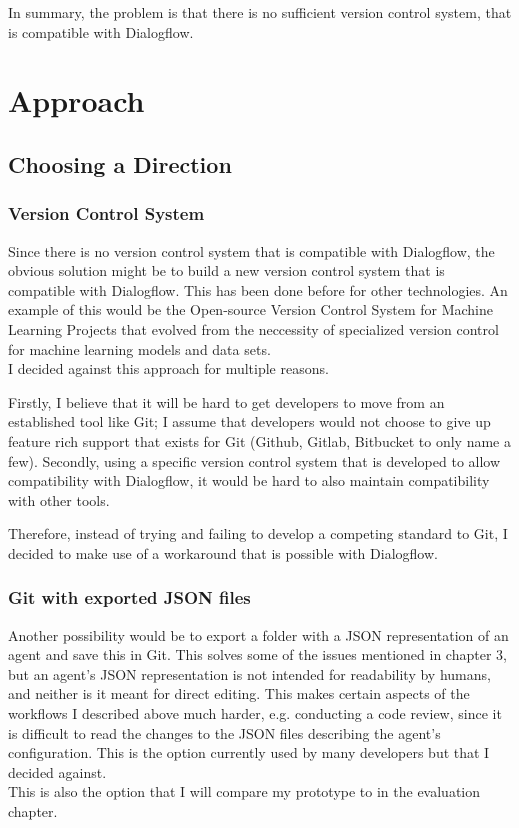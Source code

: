 In summary, the problem is that there is no sufficient version control system, that is compatible with Dialogflow.

\chapter{Approach}

\section{Choosing a Direction}

\subsection{Version Control System}

Since there is no version control system that is compatible with Dialogflow, the obvious solution might be to build a new version control system that is compatible with Dialogflow. This has been done before for other technologies.
An example of this would be the Open-source Version Control System for Machine Learning Projects that evolved from the neccessity of specialized version control for machine learning models and data sets.\cite{Petrov}\\
I decided against this approach for multiple reasons.

Firstly, I believe that it will be hard to get developers to move from an established tool like Git; I assume that developers would not choose to give up feature rich support that exists for Git (Github, Gitlab, Bitbucket to only name a few).
Secondly, using a specific version control system that is developed to allow compatibility with Dialogflow, it would be hard to also maintain compatibility with other tools.

Therefore, instead of trying and failing to develop a competing standard to Git, I decided to make use of a workaround that is possible with Dialogflow.

\subsection{Git with exported JSON files}

Another possibility would be to export a folder with a JSON representation of an agent and save this in Git. This solves some of the issues mentioned in chapter 3, but an agent's JSON representation is not intended for readability by humans, and neither is it meant for direct editing. This makes certain aspects of the workflows I described above much harder, e.g. conducting a code review, since it is difficult to read the changes to the JSON files describing the agent’s configuration.
This is the option currently used by many developers \cite{Oostinga} but that I decided against.\\
This is also the option that I will compare my prototype to in the evaluation chapter.

